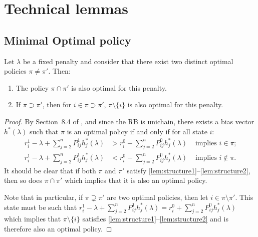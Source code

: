 \documentclass[acmsmall,screen,anonymous]{acmart}
\begin{document}
\newpage



\appendix



\section{Technical lemmas}





\subsection{Minimal Optimal policy}
\begin{lemma}
    \label{lem:structure_optimal}
    Let $\lambda$ be a fixed penalty and consider that there exist two distinct optimal policies $\pi\ne\pi'$. Then:
    \begin{enumerate}
        \item The policy $\pi\cap\pi'$ is also optimal for this penalty.
        \item If $\pi\supset\pi'$, then for  $i\in\pi \supset \pi'$,  $\pi\setminus\{i\}$ is also optimal for this penalty. %
    \end{enumerate}
\end{lemma}

\begin{proof}
    By Section~8.4 of \cite{putermanMarkovDecisionProcesses1994}, and since the RB is unichain,  there exists a bias vector $h^*(\lambda)$ such that $\pi$ is an optimal policy if and only if for all state $i$:
    \begin{align}
        r^1_i - \lambda + \sum_{j=2}^n P^{1}_{ij} h^*_j(\lambda) &> r^0_i + \sum_{j=2}^n P^{0}_{ij} h^*_j(\lambda) &\text{ implies 
        $i\in\pi$;}\label{lem:structure1}\\
        r^1_i - \lambda + \sum_{j=2}^n P^{1}_{ij} h^*_j(\lambda) &< r^0_i + \sum_{j=2}^n P^{0}_{ij} h^*_j(\lambda) &\text{ implies $i\not\in\pi$.}
        \label{lem:structure2}
    \end{align}
    It should be clear that if both $\pi$ and $\pi'$ satisfy \eqref{lem:structure1}--\eqref{lem:structure2}, then so does $\pi\cap\pi'$ which implies that it is also an optimal policy. 
    
    Note that in particular, if $\pi\supsetneq\pi'$ are two optimal policies, then let $i\in\pi\setminus\pi'$. This state must be such that
    $r^1_i - \lambda + \sum_{j=2}^n P^{1}_{ij} h^*_j(\lambda) = r^0_i + \sum_{j=2}^n P^{0}_{ij} h^*_j(\lambda)$ which implies that $\pi\setminus\{i\}$ satisfies \eqref{lem:structure1}--\eqref{lem:structure2} and is therefore also an optimal policy. 
\end{proof}
\end{document}
